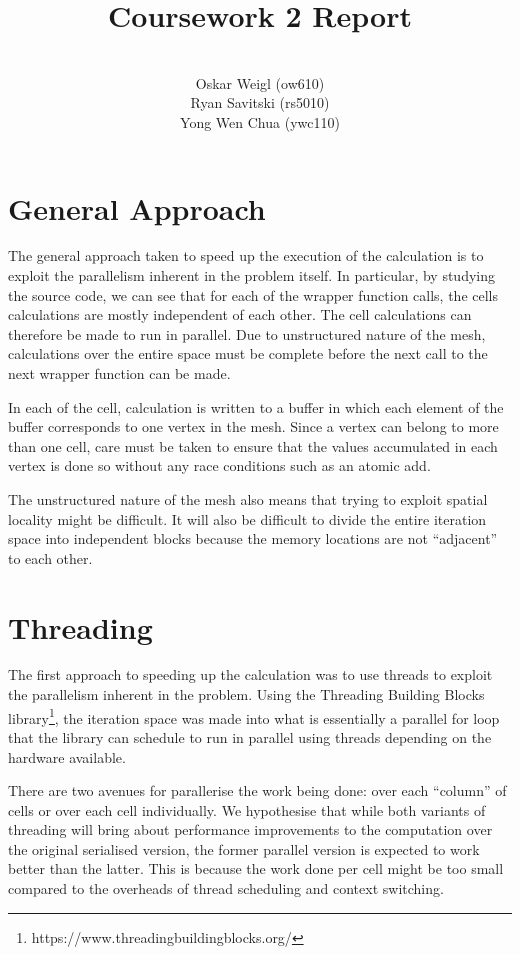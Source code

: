 \documentclass{article}
\date{}
\title{Coursework 2 Report}
\author{\\
  \small{Oskar Weigl (ow610)}\\
  \small{Ryan Savitski (rs5010)}\\
  \small{Yong Wen Chua (ywc110)}
}
\begin{document}
\maketitle
\section{General Approach}

The general approach taken to speed up the execution of the calculation is to exploit the parallelism inherent in the problem itself. In particular, by studying the source code, we can see that for each of the wrapper function calls, the cells calculations are mostly independent of each other. The cell calculations can therefore be made to run in parallel. Due to unstructured nature of the mesh, calculations over the entire space must be complete before the next call to the next wrapper function can be made.

In each of the cell, calculation is written to a buffer in which each element of the buffer corresponds to one vertex in the mesh. Since a vertex can belong to more than one cell, care must be taken to ensure that the values accumulated in each vertex is done so without any race conditions such as an atomic add.

The unstructured nature of the mesh also means that trying to exploit spatial locality might be difficult. It will also be difficult to divide the entire iteration space into independent blocks because the memory locations are not ``adjacent'' to each other. 

\section{Threading}

The first approach to speeding up the calculation was to use threads to exploit the parallelism inherent in the problem. Using the Threading Building Blocks library\footnote{https://www.threadingbuildingblocks.org/}, the iteration space was made into what is essentially a parallel for loop that the library can schedule to run in parallel using threads depending on the hardware available. 

There are two avenues for parallerise the work being done: over each ``column'' of cells or over each cell individually.  We hypothesise that while both variants of threading will bring about performance improvements to the computation over the original serialised version, the former parallel version is expected to work better than the latter. This is because the work done per cell might be too small compared to the overheads of thread scheduling and context switching. 
\end{document}
